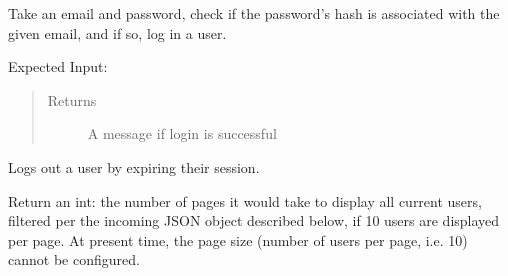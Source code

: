 \documentclass[letterpaper,10pt,english]{sphinxmanual}
\begin{document}
\begin{fulllineitems}
\begin{fulllineitems}
\label{\detokenize{apidoc/utdesign_procurement:utdesign_procurement.apigateway.ApiGateway.userLogin}}
Take an email and password, check if the password’s hash
is associated with the given email, and if so, log in a user.

Expected Input:

\begin{sphinxVerbatim}[commandchars=\\\{\}]
     
     
\end{sphinxVerbatim}
\begin{quote}\begin{description}
\item[{Returns}] \leavevmode
A message if login is successful

\end{description}\end{quote}

\end{fulllineitems}


\begin{fulllineitems}
\label{\detokenize{apidoc/utdesign_procurement:utdesign_procurement.apigateway.ApiGateway.userLogout}}
Logs out a user by expiring their session.

\end{fulllineitems}


\begin{fulllineitems}
\label{\detokenize{apidoc/utdesign_procurement:utdesign_procurement.apigateway.ApiGateway.userPages}}
Return an int: the number of pages it would take to
display all current users, filtered per the incoming JSON
object described below, if 10 users are displayed per page.
At present time, the page size (number of users per page, i.e. 10)
cannot be configured.


\end{fulllineitems}
\end{fulllineitems}
\end{document}
